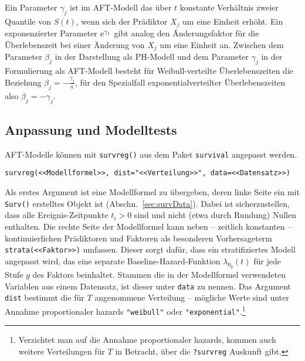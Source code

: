 Ein Parameter $\gamma_{j}$ ist im AFT-Modell das über $t$ konstante Verhältnis zweier Quantile von $S(t)$, wenn sich der Prädiktor $X_{j}$ um eine Einheit erhöht. Ein exponenzierter Parameter ${\mathrm{e}}^{\gamma_{j}}$ gibt analog den Änderungsfaktor für die Überlebenszeit bei einer Änderung von $X_{j}$ um eine Einheit an. Zwischen dem Parameter $\beta_{j}$ in der Darstellung als PH-Modell und dem Parameter $\gamma_{j}$ in der Formulierung als AFT-Modell besteht für Weibull-verteilte Überlebenszeiten die Beziehung $\beta_{j} = -\frac{\gamma_{j}}{a}$, für den Spezialfall exponentialverteilter Überlebenszeiten also $\beta_{j} = -\gamma_{j}$.

\subsection{Anpassung und Modelltests}

AFT-Modelle können mit \lstinline!survreg()! aus dem Paket \lstinline!survival! angepasst werden.
\begin{lstlisting}
survreg(<<Modellformel>>, dist="<<Verteilung>>", data=<<Datensatz>>)
\end{lstlisting}

Als erstes Argument ist eine Modellformel zu übergeben, deren linke Seite ein mit \lstinline!Surv()! erstelltes Objekt ist (Abschn.\ \ref{sec:survData}). Dabei ist sicherzustellen, dass alle Ereignis-Zeitpunkte $t_{i} > 0$ sind und nicht (etwa durch Rundung) Nullen enthalten. Die rechte Seite der Modellformel kann neben -- zeitlich konstanten -- kontinuierlichen Prädiktoren und Faktoren als besonderen Vorhersageterm \lstinline!strata(<<Faktor>>)! umfassen. Dieser sorgt dafür, dass ein stratifiziertes Modell angepasst wird, das eine separate Baseline-Hazard-Funktion $\lambda_{0_{g}}(t)$ für jede Stufe $g$ des Faktors beinhaltet. Stammen die in der Modellformel verwendeten Variablen aus einem Datensatz, ist dieser unter \lstinline!data! zu nennen. Das Argument \lstinline!dist! bestimmt die für $T$ angenommene Verteilung -- mögliche Werte sind unter Annahme proportionaler hazards \lstinline!"weibull"! oder \lstinline!"exponential"!.\footnote{Verzichtet man auf die Annahme proportionaler hazards, kommen auch weitere Verteilungen für $T$ in Betracht, über die \lstinline!?survreg! Auskunft gibt.}

